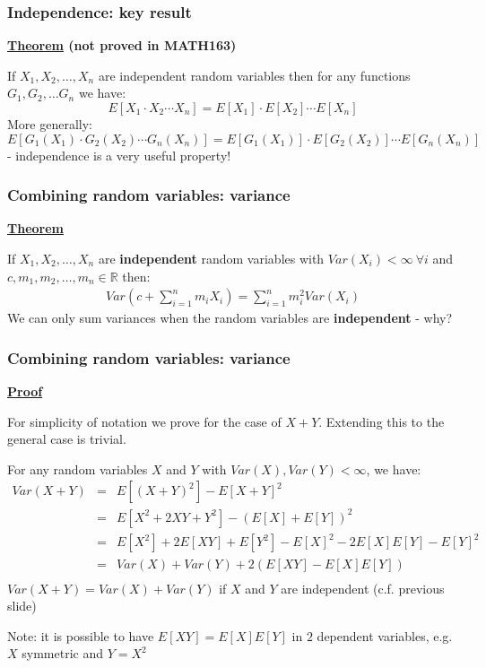 \documentclass[t,8pt]{beamer}%
\begin{document}
\begin{frame}
	\frametitle{Independence: key result}
    {\bf\underline{Theorem} (not proved in MATH163)} \par
    If $X_1,X_2,\dots,X_n$ are independent random variables then for any functions $G_1,G_2,\dots G_n$ we have:
    $$E[X_1\cdot X_2\cdots X_n]=E[X_1]\cdot E[X_2]\cdots E[X_n]$$
    More generally:
    $$E[G_1(X_1)\cdot G_2(X_2)\cdots G_n(X_n)]=E[G_1(X_1)]\cdot E[G_2(X_2)]\cdots E[G_n(X_n)]$$
    - independence is a very useful property!
\end{frame}

\begin{frame}
	\frametitle{Combining random variables: variance}
    {\bf\underline{Theorem}} \par
    If $X_1,X_2,\dots,X_n$ are {\bf independent} random variables with $Var(X_i)<\infty\ \forall i$ and $c,m_1,m_2,\dots,m_n\in\mathbb R$ then:
    \begin{eqnarray*}
        Var\left(c+\sum_{i=1}^nm_iX_i\right)=\sum_{i=1}^nm_i^2Var(X_i)
    \end{eqnarray*}
    We can only sum variances when the random variables are {\bf independent} - why? \par
\end{frame}

\begin{frame}
	\frametitle{Combining random variables: variance}
    {\bf\underline{Proof}} \par
    For simplicity of notation we prove for the case of $X+Y$. Extending this to the general case is trivial. \par
    For any random variables $X$ and $Y$ with $Var(X),Var(Y)<\infty$, we have:
    \begin{eqnarray*}
        Var(X+Y)&=&E[(X+Y)^2]-E[X+Y]^2\\
        &=&E[X^2+2XY+Y^2]-\left(E[X]+E[Y]\right)^2\\
        &=&E[X^2]+2E[XY]+E[Y^2]-E[X]^2-2E[X]E[Y]-E[Y]^2\\
        &=&Var(X)+Var(Y)+2\left(E[XY]-E[X]E[Y]\right)\\
    \end{eqnarray*}
    $Var(X+Y)=Var(X)+Var(Y)$ if $X$ and $Y$ are independent (c.f. previous slide) \par
    Note: it is possible to have $E[XY]=E[X]E[Y]$ in $2$ dependent variables, e.g. $X$ symmetric and $Y=X^2$
\end{frame}
\end{document}
